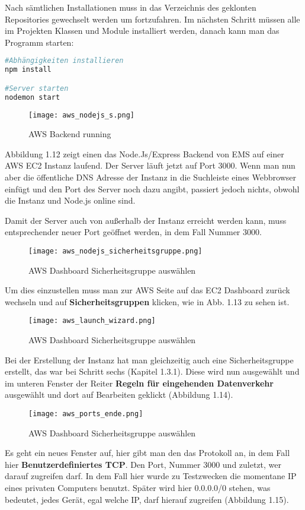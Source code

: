 Nach sämtlichen Installationen muss in das Verzeichnis des geklonten Repositories gewechselt werden um fortzufahren.
Im nächsten Schritt müssen alle im Projekten Klassen und Module installiert werden, danach kann man das Programm starten:
\begin{lstlisting}[language=bash]
#Abhängigkeiten installieren
npm install

#Server starten
nodemon start
\end{lstlisting}
\begin{center}
\begin{figure}[H]
    \centering
    \texttt{[image: aws\_nodejs\_s.png]}
    \caption{AWS Backend running}
\end{figure}
\end{center}
Abbildung 1.12 zeigt einen das Node.Js/Express Backend von EMS auf einer AWS EC2 Instanz laufend. 
Der Server läuft jetzt auf Port 3000. 
Wenn man nun aber die öffentliche DNS Adresse der Instanz in die Suchleiste eines Webbrowser einfügt und den Port des Server noch dazu angibt, passiert jedoch nichts,
obwohl die Instanz und Node.js online sind.

Damit der Server auch von außerhalb der Instanz erreicht werden kann, muss entsprechender neuer Port geöffnet werden, in dem Fall Nummer 3000.
\begin{center}
\begin{figure}[h]
    \centering
    \texttt{[image: aws\_nodejs\_sicherheitsgruppe.png]}
    \caption{AWS Dashboard Sicherheitsgruppe auswählen}
\end{figure}
\end{center}
Um dies einzustellen muss man zur AWS Seite auf das EC2 Dashboard zurück wechseln und auf \textbf{Sicherheitsgruppen} klicken, wie in Abb. 1.13 zu sehen ist. 
\begin{center}
\begin{figure}[H]
    \centering
    \texttt{[image: aws\_launch\_wizard.png]}
    \caption{AWS Dashboard Sicherheitsgruppe auswählen}
\end{figure}
\end{center}
Bei der Erstellung der Instanz hat man gleichzeitig auch eine Sicherheitsgruppe erstellt, das war bei Schritt sechs (Kapitel 1.3.1).
Diese wird nun ausgewählt und im unteren Fenster der Reiter \textbf{Regeln für eingehenden Datenverkehr} ausgewählt und dort auf Bearbeiten geklickt (Abbildung 1.14).
\begin{center}
\begin{figure}[h]
    \centering
    \texttt{[image: aws\_ports\_ende.png]}
    \caption{AWS Dashboard Sicherheitsgruppe auswählen}
\end{figure}
\end{center}
Es geht ein neues Fenster auf, hier gibt man den das Protokoll an, in dem Fall hier \textbf{Benutzerdefiniertes TCP}. Den Port, Nummer 3000 und zuletzt, wer darauf zugreifen darf. In dem Fall hier
wurde zu Testzwecken die momentane IP eines privaten Computers benutzt. Später wird hier 0.0.0.0/0 stehen, was bedeutet, jedes Gerät, egal welche IP, darf hierauf zugreifen (Abbildung 1.15). 

